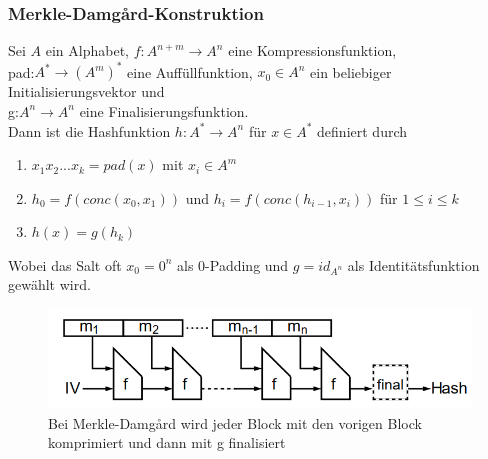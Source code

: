 \documentclass[a4paper,12pt]{article}
\begin{document}
\subsubsection{Merkle-Damg\r{a}rd-Konstruktion}
Sei $A$ ein Alphabet, $f: A^{n+m}\rightarrow A^n$ eine Kompressionsfunktion,\\
pad:$A^*\rightarrow (A^m)^*$ eine Auffüllfunktion, $x_0\in A^n$ ein beliebiger Initialisierungsvektor und\\
g:$A^n\rightarrow A^n$ eine Finalisierungsfunktion.\\
Dann ist die Hashfunktion $h: A^*\rightarrow A^n$ für $x\in A^*$ definiert durch
\begin{enumerate}
\item $x_1x_2...x_k=pad(x)$ mit $x_i\in A^m$
\item $h_0=f\left( conc(x_0,x_1)\right)$ und $h_i=f\left(conc(h_{i-1},x_i)\right)$ für $1\leq i\leq k$
\item $h(x)=g(h_k)$
\end{enumerate}
Wobei das Salt oft $x_0=0^n$ als 0-Padding und $g=id_{A^n}$ als Identitätsfunktion gewählt wird.
\begin{figure}
\centering
\includegraphics[scale=0.6]{Grafiken/merkledamgard.png}
\caption{Bei Merkle-Damg\r{a}rd wird jeder Block mit den vorigen Block komprimiert und dann mit g finalisiert}
\end{figure}
\end{document}
